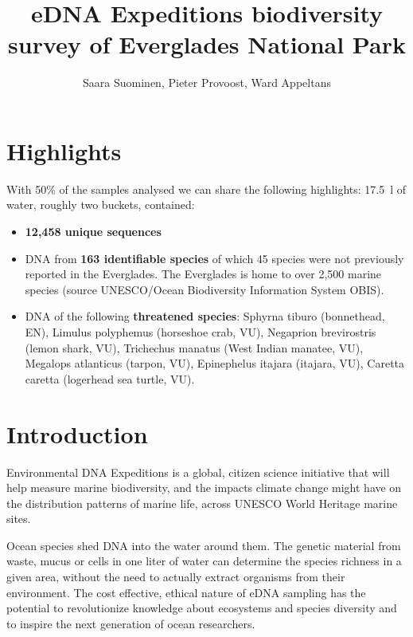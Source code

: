 \documentclass[10pt]{article}
\title{eDNA Expeditions biodiversity survey of Everglades National Park}
\author{Saara Suominen, Pieter Provoost, Ward Appeltans}
\begin{document}

\maketitle

\section*{Highlights}

With 50\% of the samples analysed we can share the following highlights: \SI{17.5}{\litre} of water, roughly two buckets, contained:

\begin{itemize}
\item \textbf{12,458 unique sequences}
\item DNA from \textbf{163 identifiable species} of which 45 species were not previously reported in the Everglades. The Everglades is home to over 2,500 marine species (source UNESCO/Ocean Biodiversity Information System OBIS).
\item DNA of the following \textbf{threatened species}: Sphyrna tiburo (bonnethead, EN), Limulus polyphemus (horseshoe crab, VU), Negaprion brevirostris (lemon shark, VU), Trichechus manatus (West Indian manatee, VU), Megalops atlanticus (tarpon, VU), Epinephelus itajara (itajara, VU), Caretta caretta (logerhead sea turtle, VU).
\end{itemize}

\section*{Introduction}

\begin{multicols}{2}
Environmental DNA Expeditions is a global, citizen science initiative that will help measure marine biodiversity, and the impacts climate change might have on the distribution patterns of marine life, across UNESCO World Heritage marine sites.

Ocean species shed DNA into the water around them. The genetic material from waste, mucus or cells in one liter of water can determine the species richness in a given area, without the need to actually extract organisms from their environment.
The cost effective, ethical nature of eDNA sampling has the potential to revolutionize knowledge about ecosystems and species diversity and to inspire the next generation of ocean researchers.
\end{multicols}
\end{document}
